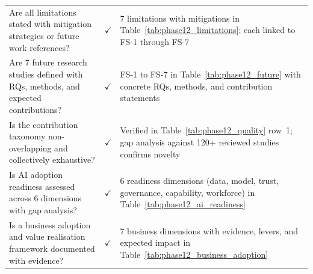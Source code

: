 \begin{xltabular}{\textwidth}{@{} X c X @{}}
\addlinespace
Are all limitations stated with mitigation strategies or future work references?            & $\checkmark$ & 7 limitations with mitigations in Table~\ref{tab:phase12_limitations}; each linked to FS-1 through FS-7 \\
\addlinespace
Are 7 future research studies defined with RQs, methods, and expected contributions?       & $\checkmark$ & FS-1 to FS-7 in Table~\ref{tab:phase12_future} with concrete RQs, methods, and contribution statements \\
\addlinespace
Is the contribution taxonomy non-overlapping and collectively exhaustive?                   & $\checkmark$ & Verified in Table~\ref{tab:phase12_quality} row~1; gap analysis against 120+ reviewed studies confirms novelty \\
\addlinespace
Is AI adoption readiness assessed across 6 dimensions with gap analysis?                   & $\checkmark$ & 6 readiness dimensions (data, model, trust, governance, capability, workforce) in Table~\ref{tab:phase12_ai_readiness} \\
\addlinespace
Is a business adoption and value realisation framework documented with evidence?            & $\checkmark$ & 7 business dimensions with evidence, levers, and expected impact in Table~\ref{tab:phase12_business_adoption} \\
\end{xltabular}
\endgroup

\clearpage
